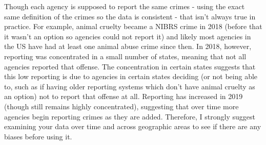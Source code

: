 \documentclass[
]{krantz}
\begin{document}
Though each agency is supposed to report the same crimes -
using the exact same definition of the crimes so the data is
consistent - that isn't always true in practice. For
example, animal cruelty became a NIBRS crime in 2018 (before
that it wasn't an option so agencies could not report it)
and likely most agencies in the US have had at least one
animal abuse crime since then. In 2018, however, reporting
was concentrated in a small number of states, meaning that
not all agencies reported that offense. The concentration in
certain states suggests that this low reporting is due to
agencies in certain states deciding (or not being able to,
such as if having older reporting systems which don't have
animal cruelty as an option) not to report that offense at
all. Reporting has increased in 2019 (though still remains
highly concentrated), suggesting that over time more
agencies begin reporting crimes as they are added.
Therefore, I strongly suggest examining your data over time
and across geographic areas to see if there are any biases
before using it.
\end{document}
